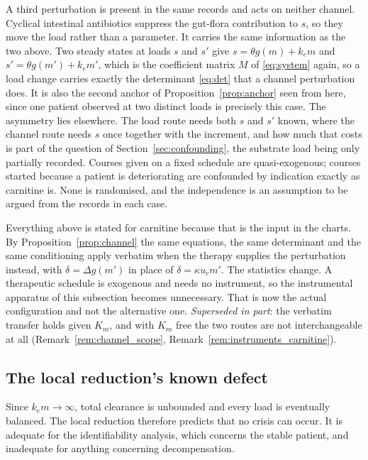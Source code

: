 A third perturbation is present in the same records and acts on neither channel. Cyclical
intestinal antibiotics suppress the gut-flora contribution to $s$, so they move the load
rather than a parameter. It carries the same information as the two above. Two steady
states at loads $s$ and $s'$ give $s = \theta g(m) + k_e m$ and
$s' = \theta g(m') + k_e m'$, which is the coefficient matrix $M$ of \eqref{eq:system}
again, so a load change carries exactly the determinant \eqref{eq:det} that a channel
perturbation does. It is also the second anchor of Proposition~\ref{prop:anchor} seen from
here, since one patient observed at two distinct loads is precisely this case.
The asymmetry lies elsewhere. The load route needs both $s$ and $s'$ known, where the
channel route needs $s$ once together with the increment, and how much that costs is part
of the question of Section~\ref{sec:confounding}, the substrate load being only partially
recorded. Courses given on a fixed schedule are quasi-exogenous;
courses started because a patient is deteriorating are confounded by indication exactly as
carnitine is. None is randomised, and the independence is an assumption to be
argued from the records in each case.

\begin{remark}
Everything above is stated for carnitine because that is the input in the charts. By
Proposition~\ref{prop:channel} the same equations, the same determinant and the same
conditioning apply verbatim when the therapy supplies the perturbation instead, with
$\delta = \Delta g(m')$ in place of $\delta = \kappa u_c m'$. The statistics change. A
therapeutic schedule is exogenous and needs no instrument, so the instrumental apparatus of
this subsection becomes unnecessary. That is now the actual configuration and not the
alternative one. \emph{Superseded in part}: the verbatim transfer holds given $K_m$, and
with $K_m$ free the two routes are not interchangeable at all
(Remark~\ref{rem:channel_scope}, Remark~\ref{rem:instruments_carnitine}).
\end{remark}

\subsection{The local reduction's known defect}

Since $k_e m \to \infty$, total clearance is unbounded and every load is eventually
balanced. The local reduction therefore predicts that no crisis can occur. It is adequate for the
identifiability analysis, which concerns the stable patient, and inadequate for anything
concerning decompensation.

